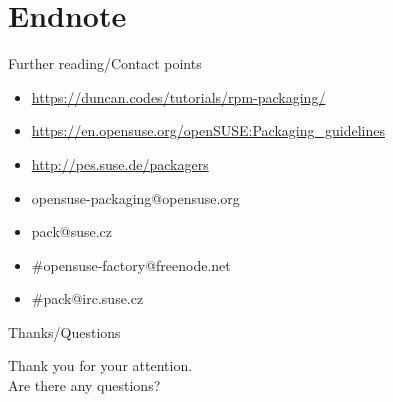 \documentclass{beamer}
\begin{document}
\section{Endnote}

\begin{frame}[t]{Further reading/Contact points}
	\begin{itemize}
	\item \url{https://duncan.codes/tutorials/rpm-packaging/}
	\item \url{https://en.opensuse.org/openSUSE:Packaging\_guidelines}
	\item \url{http://pes.suse.de/packagers}
	\item opensuse-packaging@opensuse.org
	\item pack@suse.cz
	\item \#opensuse-factory@freenode.net 
	\item \#pack@irc.suse.cz
	\end{itemize}
\end{frame}

\begin{frame}{Thanks/Questions}
	\begin{center}
	Thank you for your attention.\\
	Are there any questions?
	\end{center}
\end{frame}
\end{document}
